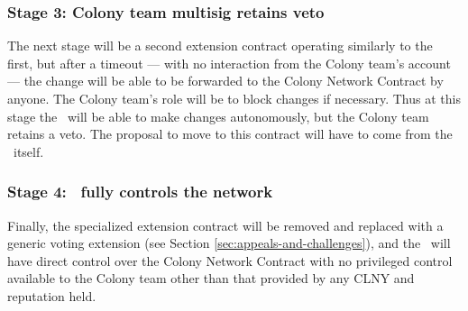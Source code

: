 \subsubsection*{Stage 3: Colony team multisig retains veto}
The next stage will be a second extension contract operating similarly to the first, but after a timeout --- with no interaction from the Colony team's account --- the change will be able to be forwarded to the Colony Network Contract by anyone. The Colony team's role will be to block changes if necessary. Thus at this stage the \rc\ will be able to make changes autonomously, but the Colony team retains a veto.  The proposal to move to this contract will have to come from the \rc\ itself.

\subsubsection*{Stage 4: \rc\ fully controls the network}
Finally, the specialized extension contract will be removed and replaced with a generic voting extension (see Section \ref{sec:appeals-and-challenges}), and the \rc\ will have direct control over the Colony Network Contract with no privileged control available to the Colony team other than that provided by any CLNY and reputation held.

